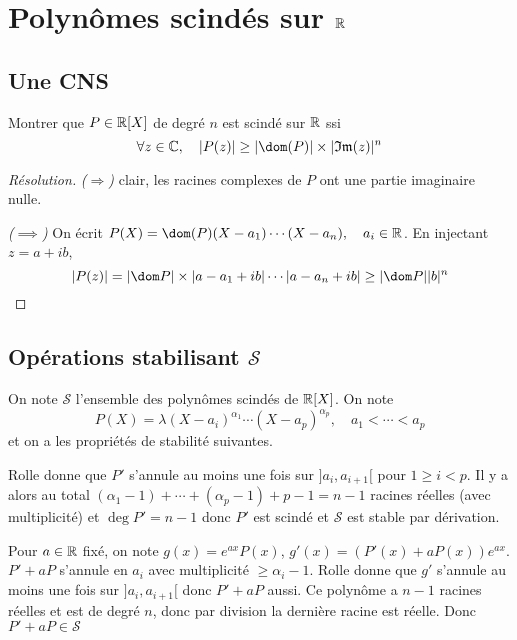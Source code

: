 \section{Polynômes scindés sur $\mathbb R$}

\subsection{Une CNS}

\begin{exo}
    Montrer que $P\in\mathbb R[X]$ de degré $n$ est scindé sur $\mathbb R$ ssi \[
        \forall z\in\C, \quad |P(z)|\geq |\dom(P)|\times |\Im(z)|^n
    \]
\end{exo}

\begin{proof}[Résolution]
    \emph{($\Longrightarrow$)} clair, les racines complexes de $P$ ont une partie imaginaire nulle.

     \emph{($\implies$)} On écrit $P(X)=\dom(P)(X-a_1)\cdots (X-a_n), \quad a_i\in\R$. En injectant $z=a+ib$, \[
        |P(z)|=|\dom P|\times |a-a_1+ib| \cdots |a-a_n+ib|\geq |\dom P| |b|^n
    \]
\end{proof}

\subsection{Opérations stabilisant $\mathcal S$}

On note $\mathcal S$ l'ensemble des polynômes scindés de $\mathbb R[X]$. On note \[
    P(X)=\lambda (X-a_i)^{\alpha_1}\cdots (X-a_p)^{\alpha_p}, \quad a_1<\cdots <a_p
\]
et on a les propriétés de stabilité suivantes.

\vspace{.2cm}

 Rolle donne que $P'$ s'annule au moins une fois sur $]a_i, a_{i+1}[$ pour $1\geq i < p$. Il y a alors au total $(\alpha_1-1)+\cdots+(\alpha_p-1)+p-1=n-1$ racines réelles (avec multiplicité) et $\deg P'=n-1$ donc $P'$ est scindé et $\mathcal S$ est stable par dérivation.

\vspace{.2cm}

 Pour $a\in\mathbb R$ fixé, on note $g(x)=e^{ax}P(x)$, $g'(x)=(P'(x)+aP(x))e^{ax}$. $P'+aP$ s'annule en $a_i$ avec multiplicité $\geq \alpha_i-1$. Rolle donne que $g'$ s'annule au moins une fois sur $]a_i, a_{i+1}[$ donc $P'+aP$ aussi. Ce polynôme a $n-1$ racines réelles et est de degré $n$, donc par division la dernière racine est réelle. Donc $P'+aP\in\mathcal S$

